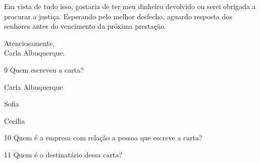 {Em vista de tudo isso, gostaria de ter meu dinheiro devolvido ou serei obrigada a procurar a justiça. Esperando pelo melhor desfecho, aguardo resposta dos senhores antes do vencimento da próxima prestação.\\

\begin{flushright}
Atenciosamente,\\

Carla Albuquerque.
\end{flushright}
}

\num{9} Quem escreveu a carta?

\begin{boxlist}
 Carla Albuquerque  

 Sofia

 Cecília
\end{boxlist}

\num{10} Quem é a empresa com relação a pessoa que escreve a carta?


\num{11} Quem é o destinatário dessa carta?


